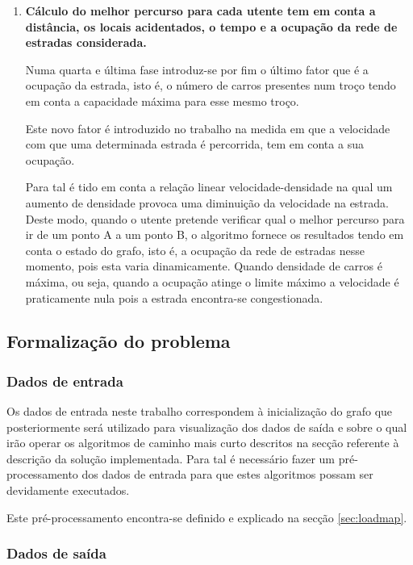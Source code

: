 \documentclass[relatorio.tex]{subfiles}
\begin{document}
\begin{enumerate}[listparindent=2em]
\item {\bfseries Cálculo do melhor percurso para cada utente tem em conta a distância, os locais acidentados, o tempo e a ocupação da rede de estradas considerada.}

Numa quarta e última fase introduz-se por fim o último fator que é a ocupação da estrada, isto é, o número de carros presentes num troço tendo em conta a capacidade máxima para esse mesmo troço.

Este novo fator é introduzido no trabalho na medida em que a velocidade com que uma determinada estrada é percorrida, tem em conta a sua ocupação. 

Para tal é tido em conta a relação linear velocidade-densidade na qual um aumento de densidade provoca uma diminuição da velocidade na estrada. Deste modo, quando o utente pretende verificar qual o melhor percurso para ir de um ponto A a um ponto B, o algoritmo fornece os resultados tendo em conta o estado do grafo, isto é, a ocupação da rede de estradas nesse momento, pois esta varia dinamicamente. Quando densidade de carros é máxima, ou seja, quando a ocupação atinge o limite máximo a velocidade é praticamente nula pois a estrada encontra-se congestionada.
\end{enumerate}



\subsection{Formalização do problema}
\label{subsec:formal}

\subsubsection{Dados de entrada}
\label{subsubsec:formalin}

Os dados de entrada neste trabalho correspondem à inicialização
do grafo que posteriormente será utilizado para visualização dos
dados de saída e sobre o qual irão operar os algoritmos de caminho
mais curto descritos na secção referente à descrição da solução implementada.
Para tal é necessário fazer um pré-processamento dos dados de entrada para
que estes algoritmos possam ser devidamente executados. 

Este pré-processamento encontra-se definido e explicado na secção \ref{sec:loadmap}.

\subsubsection{Dados de saída}
\label{subsubsec:formalout}
\end{document}
